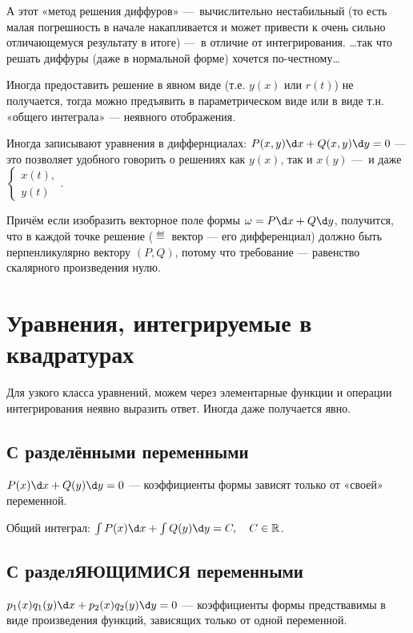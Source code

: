 \documentclass[12pt, a4paper]{article}
\begin{document}
А этот «метод решения диффуров» — вычислительно нестабильный (то есть малая погрешность в начале накапливается 
и может привести к очень сильно отличающемуся результату в итоге) — в отличие от интегрирования.
…так что решать диффуры (даже в нормальной форме) хочется по-честному…

Иногда предоставить решение в явном виде (т.е. $y(x)$ или $r(t)$)
не получается, тогда можно предъявить в параметрическом виде или
в виде т.н. «общего интеграла» — неявного отображения.

Иногда записывают уравнения в диффернциалах: $P(x, y) \d x + Q(x, y) \d y = 0$ — это позволяет удобного говорить
о решениях как $y(x)$, так и $x(y)$ — и даже $\begin{cases}
    x(t), \\
    y(t)
\end{cases}$.

Причём если изобразить векторное поле формы $\omega = P \d x + Q \d y$,
получится, что в каждой точке решение ($\eqdef$ вектор — его дифференциал) 
должно быть перпенликулярно вектору $(P, Q)$, 
потому что требование — равенство скалярного произведения нулю.



\section{Уравнения, интегрируемые в квадратурах}

Для узкого класса уравнений, можем через элементарные функции 
и операции интегрирования неявно выразить ответ. 
Иногда даже получается явно.

\subsection{С разделёнными переменными}

$P(x) \d x + Q(y) \d y = 0$ — коэффициенты формы зависят только от «своей» переменной.

Общий интеграл: $\int P(x) \d x + \int Q(y) \d y = C, \quad C \in \sR$.

\subsection{С разделЯЮЩИМИСЯ переменными}

$p_1(x) q_1(y) \d x + p_2(x) q_2(y) \d y = 0$ — коэффициенты формы предствавимы в виде произведения функций, зависящих только от одной переменной.
\end{document}

